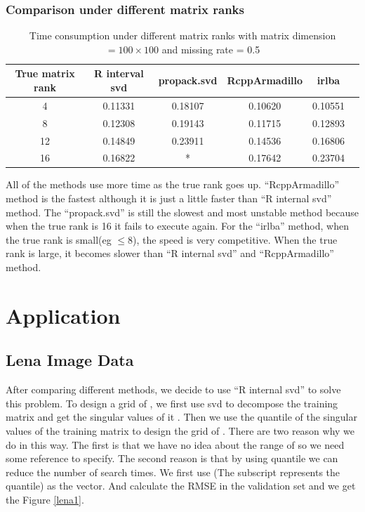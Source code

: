 \documentclass[12pt]{article}
\begin{document}
	\subsubsection{Comparison under different matrix ranks}
	
	\begin{table}[ht]
		\centering
		\caption{Time consumption under different matrix ranks with matrix dimension $=100\times 100$ and missing rate = 0.5}\label{rank}
		\begin{tabular}{cccccc}
			\hline\hline
			True matrix rank & R interval svd & propack.svd & RcppArmadillo & irlba\\
			\hline
4&0.11331&0.18107&0.10620&0.10551\\
8&0.12308&0.19143&0.11715&0.12893\\
12&0.14849&0.23911&0.14536&0.16806\\
16&0.16822&*&0.17642&0.23704\\
			\hline\hline
		\end{tabular}
	\end{table}
	
All of the methods use more time as the true rank goes up. “RcppArmadillo” method is the fastest although it is just a little faster than “R internal svd” method. The “propack.svd” is still the slowest and most unstable method because when the true rank is 16 it fails to execute again. For the “irlba” method, when the true rank is small(eg $\leq 8$), the speed is very competitive.  When the true rank is large, it becomes slower than “R internal svd” and “RcppArmadillo” method.

\section{Application}

\subsection{Lena Image Data}

After comparing different methods, we decide to use “R internal svd” to solve this problem.  To design a grid of , we first use svd to decompose the training matrix and get the singular values of it . Then we use the quantile of the singular values of the training matrix to design the grid of  . There are two reason why we do in this way. The first is that we have no idea about the range of  so we need some reference to specify. The second reason is that by using quantile we can reduce the number of search times. We first use  (The subscript represents the quantile) as the  vector. And calculate the RMSE in the validation set and we get the Figure \ref{lena1}.
\end{document}
